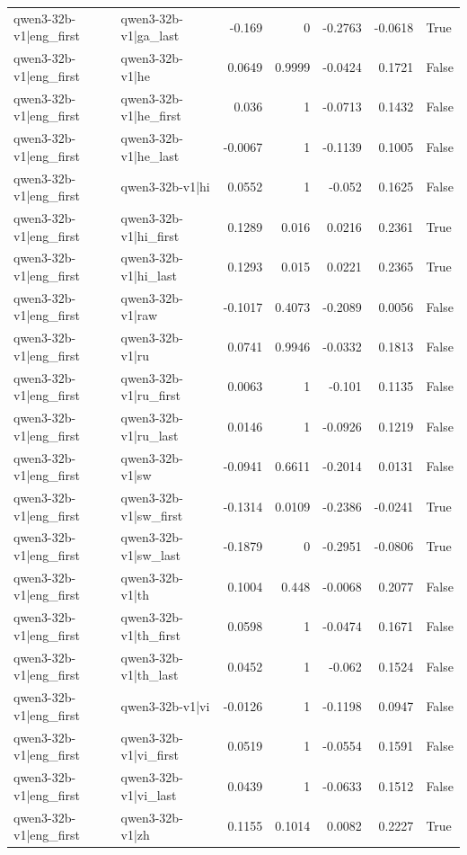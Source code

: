 \begin{table}
\begin{tabular}{l l r r r r l}
qwen3-32b-v1|eng_first & qwen3-32b-v1|ga_last & -0.169 & 0 & -0.2763 & -0.0618 & True \\
qwen3-32b-v1|eng_first & qwen3-32b-v1|he & 0.0649 & 0.9999 & -0.0424 & 0.1721 & False \\
qwen3-32b-v1|eng_first & qwen3-32b-v1|he_first & 0.036 & 1 & -0.0713 & 0.1432 & False \\
qwen3-32b-v1|eng_first & qwen3-32b-v1|he_last & -0.0067 & 1 & -0.1139 & 0.1005 & False \\
qwen3-32b-v1|eng_first & qwen3-32b-v1|hi & 0.0552 & 1 & -0.052 & 0.1625 & False \\
qwen3-32b-v1|eng_first & qwen3-32b-v1|hi_first & 0.1289 & 0.016 & 0.0216 & 0.2361 & True \\
qwen3-32b-v1|eng_first & qwen3-32b-v1|hi_last & 0.1293 & 0.015 & 0.0221 & 0.2365 & True \\
qwen3-32b-v1|eng_first & qwen3-32b-v1|raw & -0.1017 & 0.4073 & -0.2089 & 0.0056 & False \\
qwen3-32b-v1|eng_first & qwen3-32b-v1|ru & 0.0741 & 0.9946 & -0.0332 & 0.1813 & False \\
qwen3-32b-v1|eng_first & qwen3-32b-v1|ru_first & 0.0063 & 1 & -0.101 & 0.1135 & False \\
qwen3-32b-v1|eng_first & qwen3-32b-v1|ru_last & 0.0146 & 1 & -0.0926 & 0.1219 & False \\
qwen3-32b-v1|eng_first & qwen3-32b-v1|sw & -0.0941 & 0.6611 & -0.2014 & 0.0131 & False \\
qwen3-32b-v1|eng_first & qwen3-32b-v1|sw_first & -0.1314 & 0.0109 & -0.2386 & -0.0241 & True \\
qwen3-32b-v1|eng_first & qwen3-32b-v1|sw_last & -0.1879 & 0 & -0.2951 & -0.0806 & True \\
qwen3-32b-v1|eng_first & qwen3-32b-v1|th & 0.1004 & 0.448 & -0.0068 & 0.2077 & False \\
qwen3-32b-v1|eng_first & qwen3-32b-v1|th_first & 0.0598 & 1 & -0.0474 & 0.1671 & False \\
qwen3-32b-v1|eng_first & qwen3-32b-v1|th_last & 0.0452 & 1 & -0.062 & 0.1524 & False \\
qwen3-32b-v1|eng_first & qwen3-32b-v1|vi & -0.0126 & 1 & -0.1198 & 0.0947 & False \\
qwen3-32b-v1|eng_first & qwen3-32b-v1|vi_first & 0.0519 & 1 & -0.0554 & 0.1591 & False \\
qwen3-32b-v1|eng_first & qwen3-32b-v1|vi_last & 0.0439 & 1 & -0.0633 & 0.1512 & False \\
qwen3-32b-v1|eng_first & qwen3-32b-v1|zh & 0.1155 & 0.1014 & 0.0082 & 0.2227 & True \\

\end{tabular}
\end{table}
